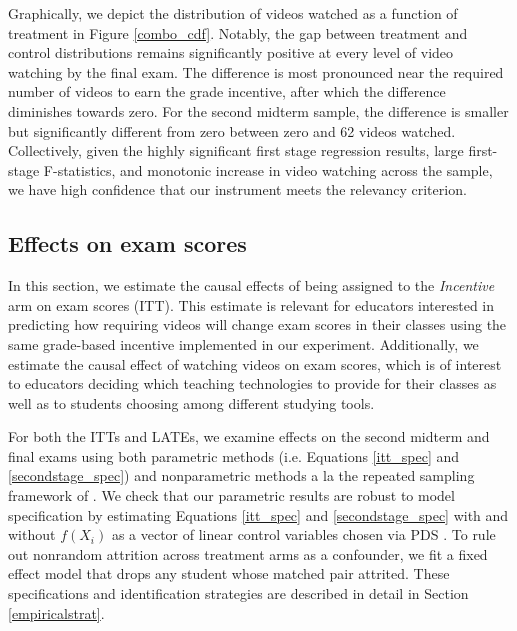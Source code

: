 \documentclass[12pt]{article}
\begin{document}
Graphically, we depict the distribution of videos watched as a function of treatment in Figure \ref{combo_cdf}. Notably, the gap between treatment and control distributions remains significantly positive at every level of video watching by the final exam. The difference is most pronounced near the required number of videos to earn the grade incentive, after which the difference diminishes towards zero. For the second midterm sample, the difference is smaller but significantly different from zero between zero and 62 videos watched. Collectively, given the highly significant first stage regression results, large first-stage F-statistics, and monotonic increase in video watching across the sample, we have high confidence that our instrument meets the relevancy criterion.

\subsection{Effects on exam scores}

In this section, we estimate the causal effects of being assigned to the \textit{Incentive} arm on exam scores (ITT). This estimate is relevant for educators interested in predicting how requiring videos will change exam scores in their classes using the same grade-based incentive implemented in our experiment. Additionally, we estimate the causal effect of watching videos on exam scores, which is of interest to educators deciding which teaching technologies to provide for their classes as well as to students choosing among different studying tools.

For both the ITTs and LATEs, we examine effects on the second midterm and final exams using both parametric methods (i.e. Equations \ref{itt_spec} and \ref{secondstage_spec}) and nonparametric methods a la the repeated sampling framework of \textcite{neyman1923}%
. We check that our parametric results are robust to model specification by estimating Equations \ref{itt_spec} and \ref{secondstage_spec} with and without $f(X_i)$ as a vector of linear control variables chosen via PDS \parencite{bch2014a}. To rule out nonrandom attrition across treatment arms as a confounder, we fit a fixed effect model that drops any student whose matched pair attrited. These specifications and identification strategies are described in detail in Section \ref{empiricalstrat}.
\end{document}
